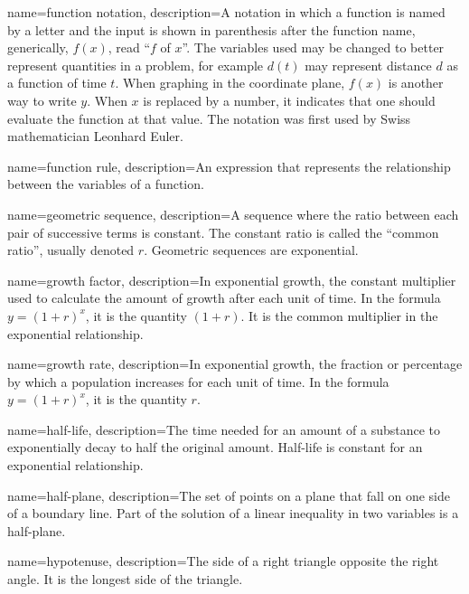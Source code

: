  {
	name=function notation,
	description={A notation in which a function is named by a letter and the input is shown in parenthesis after the function name, generically, $f(x)$, read ``$f$ of $x$''. The variables used may be changed to better represent quantities in a problem, for example $d(t)$ may represent distance $d$ as a function of time $t$. When graphing in the \gls{coordinate plane}, $f(x)$ is another way to write $y$. When $x$ is replaced by a number, it indicates that one should evaluate the function at that value. The notation was first used by Swiss mathematician Leonhard Euler.}
}

 {
	name=function rule,
	description={An expression that represents the relationship between the variables of a function.}
}


 {
	name=geometric sequence,
	description={A sequence where the ratio between each pair of successive terms is constant. The constant ratio is called the ``common ratio'', usually denoted $r$. Geometric sequences are exponential.}
}

 {
	name=growth factor,
	description={In exponential growth, the constant multiplier used to calculate the amount of growth after each unit of time. In the formula $y = (1+r)^x$, it is the quantity $(1+r)$. It is the common multiplier in the exponential relationship.}
}

 {
	name=growth rate,
	description={In exponential growth, the fraction or percentage by which a population increases for each unit of time. In the formula $y = (1+r)^x$, it is the quantity $r$.}
}

 {
	name=half-life,
	description={The time needed for an amount of a substance to exponentially decay to half the original amount. Half-life is constant for an exponential relationship.}
}

 {
	name=half-plane,
	description={The set of points on a plane that fall on one side of a boundary line. Part of the solution of a linear inequality in two variables is a half-plane.}
}

 {
	name=hypotenuse,
	description={The side of a right triangle opposite the right angle. It is the longest side of the triangle.}
}

